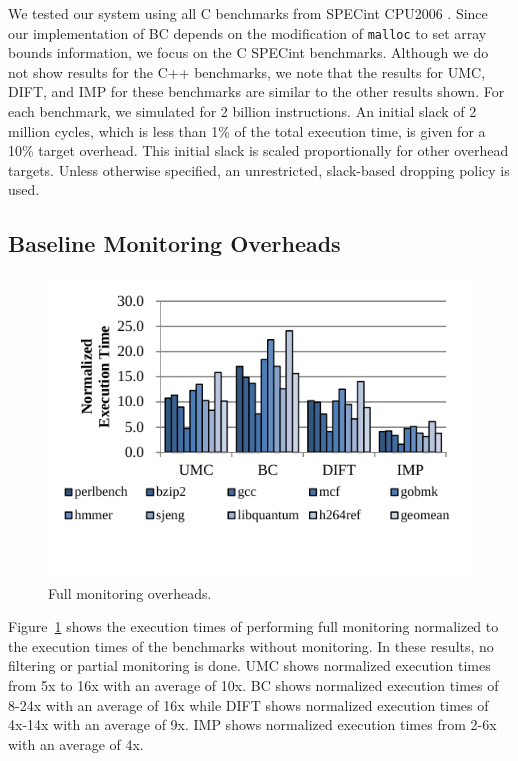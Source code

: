 We tested our system using all C benchmarks from SPECint
CPU2006 \cite{spec2006}. Since our implementation of BC depends on the
modification of {\tt malloc} to set array bounds information, we focus on the C
SPECint benchmarks. Although we do not
show results for the C++ benchmarks, we note that the results for UMC, DIFT, and IMP
for these benchmarks are similar to the other results shown. For each
benchmark, we simulated for 2 billion instructions. An initial slack of 2
million cycles, which is less than 1\% of
the total execution time, is given for a 10\% target overhead. This initial
slack is scaled proportionally for other overhead targets. Unless otherwise
specified, an unrestricted, slack-based dropping policy is used.

\subsection{Baseline Monitoring Overheads}

\begin{figure}
  \begin{center}
    \includegraphics[width=\columnwidth]{figs/data_full_mon.pdf}
    \vspace{-0.2in}
    \caption{Full monitoring overheads.}
    \label{fig:evaluation.full_mon}
    \vspace{-0.1in}
  \end{center}
\end{figure} 

Figure~\ref{fig:evaluation.full_mon} shows the execution times of
performing full monitoring normalized to the execution times of the benchmarks
without monitoring. In these results, no filtering or partial monitoring is
done. UMC shows normalized execution times from 5x to 16x with an average
of 10x. BC shows normalized execution times of 8-24x with an average of
16x while DIFT shows normalized execution times of 4x-14x with an average of
9x. IMP shows normalized execution times from 2-6x with an average of 4x. 

